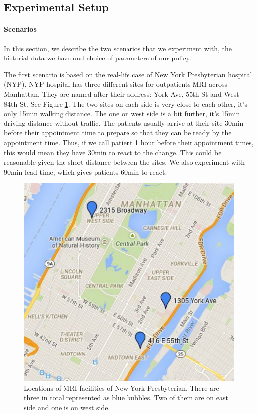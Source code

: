 \subsection{Experimental Setup}

\paragraph{Scenarios}

In this section, we describe the two scenarios that we experiment with,
the historial data we have and choice of parameters of our policy.

The first scenario is based on the real-life case of New York Presbyterian
hospital (NYP). NYP hospital has three different sites for outpatients MRI
across Manhattan. They are named after their address: York Ave, 55th St and
West 84th St. See Figure \ref{fig:site}. The two sites on each side is very
close to each other, it's only 15min walking distance. The one on west side
is a bit further, it's 15min driving distance without traffic.
The patients usually arrive at their site 30min before their appointment
time to prepare so that they can be ready by the appointment time.
Thus, if we call patient 1 hour before their appointment times, this
would mean they have 30min to react to the change. This could be reasonable
given the short distance between the sites. We also experiment with 90min
lead time, which gives patients 60min to react.

\begin{figure}
\centering
\includegraphics[scale=.6]{chap3/numeric/pic/site.pdf}
\caption{Locations of MRI facilities of New York Presbyterian. There
are three in total represented as blue bubbles. Two of them are on
east side and one is on west side.}
\label{fig:site}
\end{figure}

